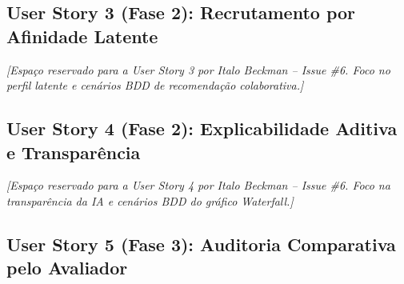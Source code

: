 \subsection{User Story 3 (Fase 2): Recrutamento por Afinidade Latente}
\label{sec:us3_recrutador}
\label{sec:us_fase2}

\noindent\textit{[Espaço reservado para a User Story 3 por Italo Beckman -- Issue \#6. Foco no perfil latente e cenários BDD de recomendação colaborativa.]}

\subsection{User Story 4 (Fase 2): Explicabilidade Aditiva e Transparência}
\label{sec:us4_explicabilidade}

\noindent\textit{[Espaço reservado para a User Story 4 por Italo Beckman -- Issue \#6. Foco na transparência da IA e cenários BDD do gráfico Waterfall.]}


\subsection{User Story 5 (Fase 3): Auditoria Comparativa pelo Avaliador}
\label{sec:us5_avaliador}

